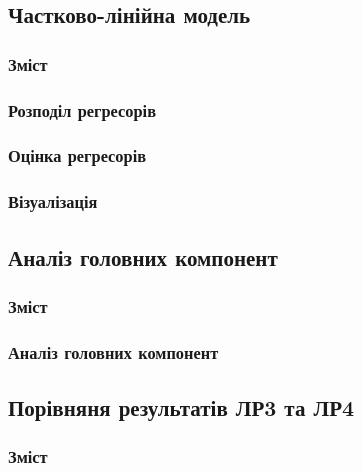 ﻿\documentclass{beamer}
\begin{document}
\begin{frame}
  \section{Частково-лінійна модель}

  \frametitle{Зміст}
  \tableofcontents[currentsection]
\end{frame}

\begin{frame}
  \frametitle{Розподіл регресорів}

\end{frame}

\begin{frame}
  \frametitle{Оцінка регресорів}

\end{frame}

\begin{frame}
  \frametitle{Візуалізація}

\end{frame}

\begin{frame}
  \section{Аналіз головних компонент}

  \frametitle{Зміст}
  \tableofcontents[currentsection]
\end{frame}

\begin{frame}
\frametitle{Аналіз головних компонент}

\end{frame}

\begin{frame}
  \section{Порівняня результатів ЛР3 та ЛР4}

  \frametitle{Зміст}
  \tableofcontents[currentsection]
\end{frame}
\end{document}
